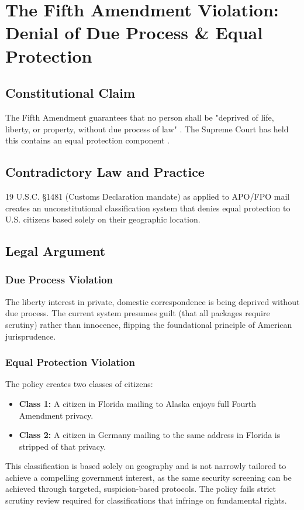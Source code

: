 ﻿\section{The Fifth Amendment Violation: Denial of Due Process \& Equal Protection}

\subsection{Constitutional Claim}
The Fifth Amendment guarantees that no person shall be "deprived of life, liberty, or property, without due process of law" \cite{usconstitution}. The Supreme Court has held this contains an equal protection component \cite{bolling1954}.

\subsection{Contradictory Law and Practice}
19 U.S.C. \S 1481 (Customs Declaration mandate) as applied to APO/FPO mail creates an unconstitutional classification system that denies equal protection to U.S. citizens based solely on their geographic location.

\subsection{Legal Argument}
\subsubsection{Due Process Violation}
The liberty interest in private, domestic correspondence is being deprived without due process. The current system presumes guilt (that all packages require scrutiny) rather than innocence, flipping the foundational principle of American jurisprudence.

\subsubsection{Equal Protection Violation}
The policy creates two classes of citizens:
\begin{itemize}
    \item \textbf{Class 1:} A citizen in Florida mailing to Alaska enjoys full Fourth Amendment privacy.
    \item \textbf{Class 2:} A citizen in Germany mailing to the same address in Florida is stripped of that privacy.
\end{itemize}

This classification is based solely on geography and is not narrowly tailored to achieve a compelling government interest, as the same security screening can be achieved through targeted, suspicion-based protocols. The policy fails strict scrutiny review required for classifications that infringe on fundamental rights.

